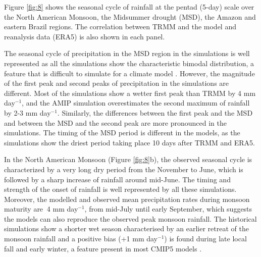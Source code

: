 Figure \ref{fig:8} shows the seasonal cycle of rainfall at the pentad (5-day) scale over the North American Monsoon, the  Midsummer drought (MSD), the Amazon and eastern Brazil regions. The correlation between TRMM and the model and reanalysis data (ERA5) is also shown in each panel. 

The seasonal cycle of precipitation in the MSD region in the simulations is well represented as all the simulations show the characteristic bimodal distribution, a feature that is difficult to simulate  for a climate model \citep{ryu2014}.
However, the magnitude of the first peak and second peaks of precipitation in the simulations are different. 
Most of the simulations show a wetter first peak than TRMM by 4 mm day$^{-1}$, and the AMIP simulation overestimates the second maximum of rainfall by 2-3 mm day$^{-1}$. Similarly, the differences between the first peak and the MSD and between the MSD and the second peak are more pronounced in the simulations. The timing of the MSD period is different in the models, as the simulations show the driest period taking place 10 days after TRMM and ERA5. %
  

In the North American Monsoon (Figure \ref{fig:8}b), the observed seasonal cycle is characterized by a very long dry period from the November to June, which is followed by a sharp increase of rainfall around mid-June. The timing and strength of the onset of rainfall is well represented by all these simulations.
Moreover, the modelled and observed mean precipitation rates during monsoon maturity are $~$4 mm day$^{-1}$, from mid-July until early September, which suggests  the models can also reproduce the observed peak monsoon rainfall.
   The historical simulations show a shorter wet season characterised by an earlier retreat of the monsoon rainfall and a positive bias (+1 mm day$^{-1}$) is found during late local fall and early winter, a feature present in most CMIP5 models \citep{geil2013}. %


